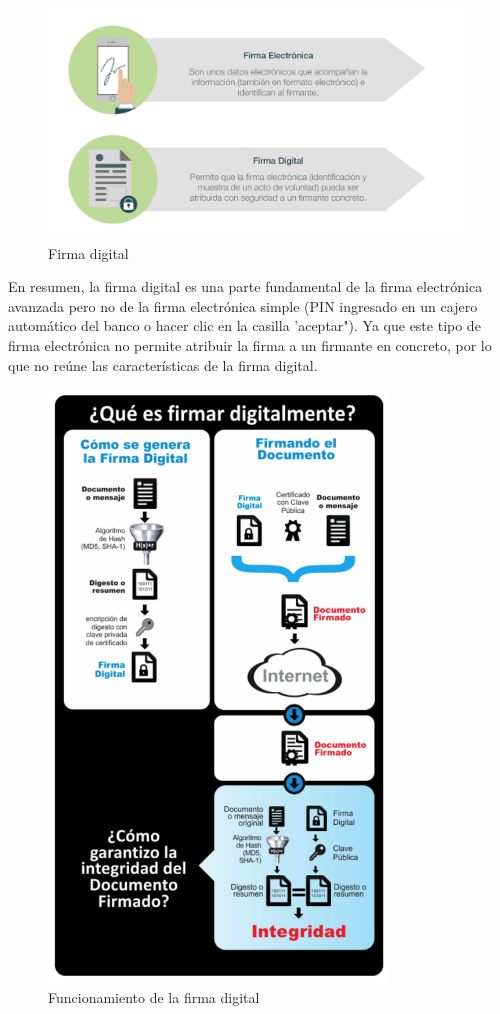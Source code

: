 \documentclass{manual}
\begin{document}
\begin{figure}[H]
	\centering
	\includegraphics[width=110mm]{images/fd}
	\caption{Firma digital} 
\end{figure}

En resumen, la firma digital es una parte fundamental de la firma electrónica avanzada pero no de la firma electrónica simple (PIN ingresado en un cajero automático del banco o hacer clic en la casilla 'aceptar"). Ya que este tipo de firma electrónica no permite atribuir la firma a un firmante en concreto, por lo que no reúne las características de la firma digital.


\begin{figure}[H]
	\centering
	\includegraphics[width=90mm]{images/digital.png}
	\caption{Funcionamiento de la firma digital} 
\end{figure}
\end{document}
